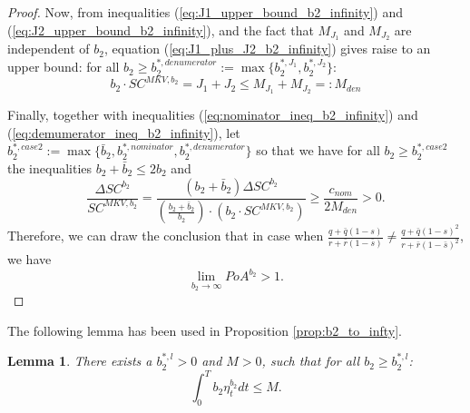\documentclass[11pt]{article}
\newtheorem{lemma}{Lemma}
\begin{document}
\begin{proof}
	Now, from inequalities (\ref{eq:J1_upper_bound_b2_infinity}) and (\ref{eq:J2_upper_bound_b2_infinity}), and the fact that $M_{J_1}$ and $M_{J_2}$ are independent of $b_2$, equation (\ref{eq:J1_plus_J2_b2_infinity}) gives raise to an upper bound: for all $b_2 \geq b_2^{*,denumerator} := \max \{ b_2^{*,J_1}, b_2^{*,J_2} \}$:
	\begin{equation} 
		b_2 \cdot SC^{MKV, b_2}  = J_1 + J_2 \leq M_{J_1} + M_{J_2} =: M_{den}
	\label{eq:demumerator_ineq_b2_infinity}
	\end{equation}
	
		
	Finally, together with inequalities (\ref{eq:nominator_ineq_b2_infinity}) and (\ref{eq:demumerator_ineq_b2_infinity}), let $b_2^{*,case 2} := \max \{ \bar{b}_2,  b_2^{*,nominator}, b_2^{*,denumerator} \}$ so that we have for all $b_2 \geq b_2^{*,case 2}$ the inequalities $ b_2 + \bar{b}_2 \leq 2 b_2$ and 
	\begin{equation}
		\frac{\Delta SC^{b_2}}{SC^{MKV,b_2}} = \frac{(b_2 + \bar{b}_2) \Delta SC^{b_2} }{\left(\frac{b_2 + \bar{b}_2}{b_2} \right) \cdot (b_2 \cdot SC^{MKV,b_2} ) } \geq \frac{c_{nom}}{ 2 M_{den}} > 0.
	\end{equation}
	Therefore, we can draw the conclusion that in case when $\frac{q+\bar{q}(1-s)}{r+\bar{r}(1-\bar{s})} \neq \frac{q+\bar{q}(1-s)^2}{r+\bar{r}(1-\bar{s})^2}$, we have 
	$$ \lim_{b_2 \to \infty} PoA^{b_2} > 1.$$ 
\end{proof}


The following lemma has been used in Proposition \ref{prop:b2_to_infty}.
\begin{lemma}
	There exists a $b_2^{*,l}>0$ and $M>0$, such that for all $b_2 \geq b_2^{*,l}$:
	$$\int_0^T b_2 \eta^{b_2}_t dt \leq M.$$
	\label{lemma:int_b2_eta_t}
\end{lemma}
\end{document}
